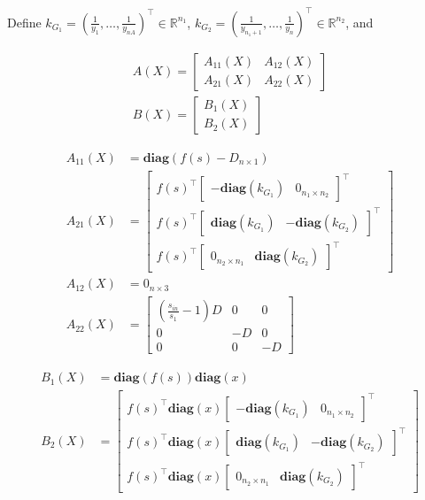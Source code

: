 \documentclass[3p,times]{elsarticle}
\newcommand{\R}{\mathbb{R}}
\newcommand{\diag}{\textbf{diag}}
\begin{document}
Define $k_{G_1} = \left ( \frac{1}{y_1},\dots,\frac{1}{y_{nA}}\right )^\top \in \R^{n_1}$,  $k_{G_2} = \left(\frac{1}{y_{n_1+1}},\dots,\frac{1}{y_{n}}\right )^\top \in \R^{n_2}$, and

\begin{align}
\label{A_matrix} A\left (X\right) = \begin{bmatrix}
A_{11}(X) & A_{12}(X) \\ A_{21}(X) & A_{22}(X)
\end{bmatrix} \\
\label{B_matrix} B\left (X\right) = \begin{bmatrix}
B_1(X) \\ B_2(X)
\end{bmatrix} 
\end{align}

\begin{align}
A_{11}(X) &= \diag(f(s)- D_{n\times 1} ) \\
A_{21}(X) &=  \begin{bmatrix} 
f(s)^\top \begin{bmatrix} -\diag(k_{G_1}) & 0_{n_1 \times n_2} \end{bmatrix}^\top  \\
f(s)^\top \begin{bmatrix} \diag(k_{G_1}) & -\diag(k_{G_2}) \end{bmatrix}^\top   \\
f(s)^\top \begin{bmatrix} 0_{n_2 \times n_1} & \diag(k_{G_2}) \end{bmatrix}^\top 
\end{bmatrix}  \\
A_{12}(X) &=  0_{n \times 3} \\
A_{22}(X) &= \begin{bmatrix} \left(\frac{s_{in}}{s_1}-1\right)D & 0 & 0 \\ 
0 &-D & 0 \\ 
0 & 0 &-D \end{bmatrix}
\end{align}

\begin{align}
B_1(X) &= \diag(f(s))\diag(x)  \\
B_2(X) &= \begin{bmatrix}
f(s)^\top \diag(x) \begin{bmatrix} -\diag(k_{G_1}) & 0_{n_1 \times n_2} \end{bmatrix}^\top \\
f(s)^\top \diag(x) \begin{bmatrix} \diag(k_{G_1}) & -\diag(k_{G_2}) \end{bmatrix}^\top  \\
f(s)^\top \diag(x) \begin{bmatrix} 0_{n_2 \times n_1} & \diag(k_{G_2}) \end{bmatrix}^\top  
\end{bmatrix}
\end{align}
\end{document}
